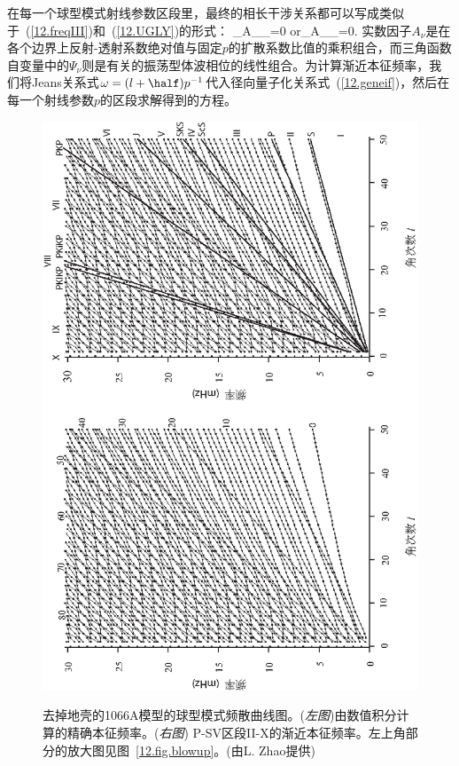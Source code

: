 在每一个球型模式射线参数区段里，最终的相长干涉关系都可以写成类似于~(\ref{12.freqIII})和~(\ref{12.UGLY})的形式：
\eq \label{12.geneif}
\sum_{\nu}A_{\nu}\sin\half\Psi_{\nu}=0\qquad
\mbox{or}\qquad\sum_{\nu}A_{\nu}\cos\half\Psi_{\nu}=0.
\en
实数因子$A_{\nu}$是在各个边界上反射-透射系数绝对值与固定$p$的扩散系数比值的乘积组合，而三角函数自变量中的$\Psi_{\nu}$则是有关的振荡型体波相位的线性组合。为计算渐近本征频率，我们将Jeans关系式$\omega=(l+\half)p^{-1}$代入径向量子化关系式~(\ref{12.geneif})，然后在每一个射线参数$p$的区段求解得到的方程。
\begin{figure}
\centering
{}
{
\includegraphics{../figures/chap12/fig15.eps}
}
\caption[Spheroidal Dispersion]{
去掉地壳的1066A模型的球型模式频散曲线图。({\em 左图\/})由数值积分计算的精确本征频率。({\em 右图\/}) P-SV区段II-X的渐近本征频率。左上角部分的放大图见图~\ref{12.fig.blowup}。(由L. Zhao提供)
}
\label{12.fig.zhao19}
\end{figure}
